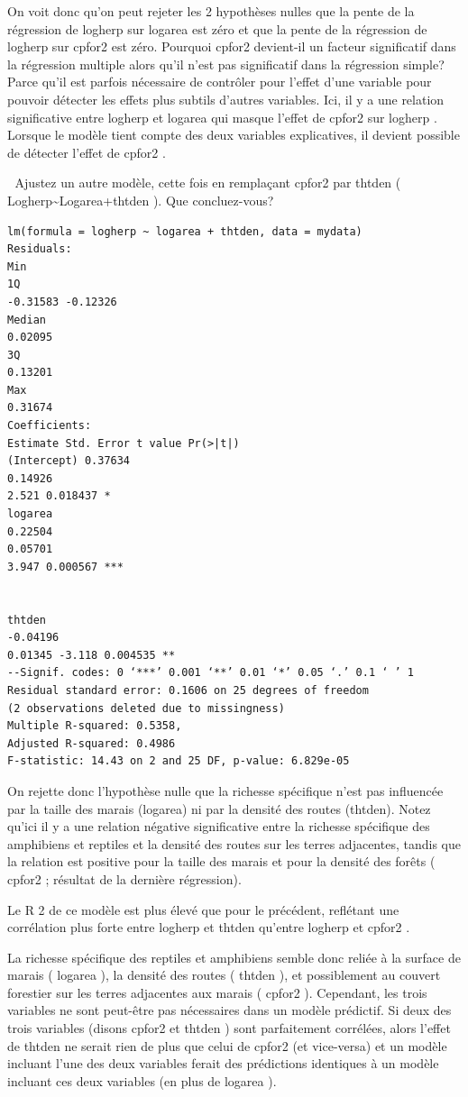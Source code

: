 \documentclass[12pt,]{book}
\begin{document}
On voit donc qu'on peut rejeter les 2 hypothèses nulles que la pente de la régression de logherp sur logarea est zéro et que la pente de la régression de logherp sur cpfor2 est zéro. Pourquoi cpfor2 devient-il un facteur significatif dans la régression multiple alors qu'il n'est pas significatif dans la régression simple? Parce qu'il est parfois nécessaire de contrôler pour l'effet d'une variable pour pouvoir détecter les effets plus subtils d'autres variables. Ici, il y a une relation significative entre logherp et logarea qui masque l'effet de cpfor2 sur logherp . Lorsque le modèle tient compte des deux variables explicatives, il devient possible de détecter l'effet de cpfor2 .

 Ajustez un autre modèle, cette fois en remplaçant cpfor2 par thtden ( Logherp\textasciitilde{}Logarea+thtden ). Que concluez-vous?

\begin{verbatim}
lm(formula = logherp ~ logarea + thtden, data = mydata)
Residuals:
Min
1Q
-0.31583 -0.12326
Median
0.02095
3Q
0.13201
Max
0.31674
Coefficients:
Estimate Std. Error t value Pr(>|t|)
(Intercept) 0.37634
0.14926
2.521 0.018437 *
logarea
0.22504
0.05701
3.947 0.000567 ***


thtden
-0.04196
0.01345 -3.118 0.004535 **
--Signif. codes: 0 ‘***’ 0.001 ‘**’ 0.01 ‘*’ 0.05 ‘.’ 0.1 ‘ ’ 1
Residual standard error: 0.1606 on 25 degrees of freedom
(2 observations deleted due to missingness)
Multiple R-squared: 0.5358,
Adjusted R-squared: 0.4986
F-statistic: 14.43 on 2 and 25 DF, p-value: 6.829e-05
\end{verbatim}

On rejette donc l'hypothèse nulle que la richesse spécifique n'est pas influencée par la taille des marais (logarea) ni par la densité des routes (thtden). Notez qu'ici il y a une relation négative significative entre la richesse spécifique des amphibiens et reptiles et la densité des routes sur les terres adjacentes, tandis que la relation est positive pour la taille des marais et pour la densité des forêts ( cpfor2 ; résultat de la dernière régression).

Le R 2 de ce modèle est plus élevé que pour le précédent, reflétant une corrélation plus forte entre logherp et thtden qu'entre logherp et cpfor2 .

La richesse spécifique des reptiles et amphibiens semble donc reliée à la surface de marais ( logarea ), la densité des routes ( thtden ), et possiblement au couvert forestier sur les terres adjacentes aux marais ( cpfor2 ). Cependant, les trois variables ne sont peut-être pas nécessaires dans un modèle prédictif. Si deux des trois variables (disons cpfor2 et thtden ) sont parfaitement corrélées, alors l'effet de thtden ne serait rien de plus que celui de cpfor2 (et vice-versa) et un modèle incluant l'une des deux variables ferait des prédictions identiques à un modèle incluant ces deux variables (en plus de logarea ).
\end{document}
